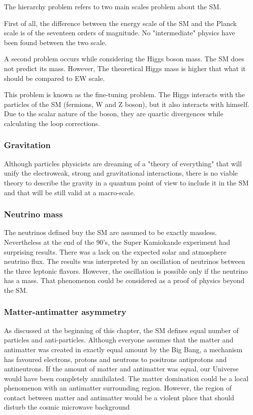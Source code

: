     The hierarchy problem refers to two main scales problem about the SM.

    First of all, the difference between the energy scale of the SM and the Planck scale is of the seventeen orders of magnitude.
    No "intermediate" physics have been found between the two scale.

    A second problem occurs while considering the Higgs boson mass.
    The SM does not predict its mass.
    However, 
    The theoretical Higgs mass is higher that what it should be compared to EW scale.

    This problem is known as the fine-tuning problem. 
    The Higgs interacts with the particles of the SM (fermions, W and Z boson), but it also interacts with himself.
    Due to the scalar nature of the boson, they are quartic divergences while calculating the loop corrections.
    
    \subsubsection{Gravitation}

    Although particles physicists are dreaming of a "theory of everything" that will unify the electroweak, strong and gravitational interactions,
    there is no viable theory to describe the gravity in a quantum point of view to include it in the SM and that will be still valid at a macro-scale.

    \subsubsection{Neutrino mass}

    The neutrinos defined buy the SM are assumed to be exactly massless.
    Nevertheless at the end of the 90's, the Super Kamiokande experiment had surprising results.
    There was a lack on the expected solar and atmosphere neutrino flux. 
    The results was interpreted by an oscillation of neutrinos between the three leptonic flavors.
    However, the oscillation is possible only if the neutrino has a mass.
    That phenomenon could be considered as a proof of physics beyond the SM.

    \subsubsection{Matter-antimatter asymmetry}

    As discussed at the beginning of this chapter, the SM defines equal number of particles and anti-particles. 
    Although everyone assumes that the matter and antimatter was created in exactly equal amount by the Big Bang, a mechanism has favoured electrons, protons and neutrons to positrons antiprotons and antineutrons.
    If the amount of matter and antimatter was equal, our Universe would have been completely annihilated.
    The matter domination could be a local phenomenon with an antimatter surrounding region. 
    However, the region of contact between matter and antimatter would be a violent place that should disturb the cosmic microwave background 

